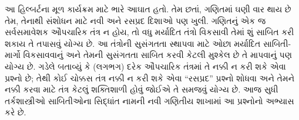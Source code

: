 \documentclass[../../../include/open-logic-section]{subfiles}
\begin{document}
આ હિલ્બર્ટના મૂળ કાર્યક્રમ માટે ભારે આઘાત હતો.
તેમ છતાં, ગણિતમાં ઘણી વાર થાય છે તેમ, તેનાથી
સંશોધન માટે નવી અને રસપ્રદ દિશાઓ પણ ખુલી.
ગણિતનું એક જ સર્વસમાવેશક ઔપચારિક તંત્ર ન હોય,
તો વધુ મર્યાદિત તંત્રો વિકસાવી તેમાં શું સાબિત
કરી શકાય તે તપાસવું યોગ્ય છે. આ તંત્રોની
સુસંગતતા સ્થાપવા માટે ઓછા મર્યાદિત સાબિતી-માર્ગો
વિકસાવવાનું અને તેમની સુસંગતતા સાબિત કરવી કેટલી
મુશ્કેલ છે તે માપવાનું પણ યોગ્ય છે. ગડેલે બતાવ્યું
કે (લગભગ) દરેક ઔપચારિક તંત્રમાં તે નક્કી ન
કરી શકે એવા પ્રશ્નો છે; તેથી કોઈ ચોક્કસ તંત્ર
નક્કી ન કરી શકે એવા ``રસપ્રદ'' પ્રશ્નો શોધવા
અને તેમને નક્કી કરવા માટે તંત્ર કેટલું શક્તિશાળી
હોવું જોઈએ તે સમજવું યોગ્ય છે. આજ સુધી
તર્કશાસ્ત્રીઓ સાબિતીઓના સિદ્ધાંત નામની નવી
ગણિતીય શાખામાં આ પ્રશ્નોનો અભ્યાસ કરે છે.
\end{document}
